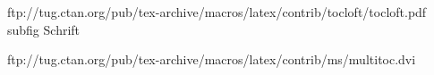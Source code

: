ftp://tug.ctan.org/pub/tex-archive/macros/latex/contrib/tocloft/tocloft.pdf
subfig
%
Schrift
%

ftp://tug.ctan.org/pub/tex-archive/macros/latex/contrib/ms/multitoc.dvi


